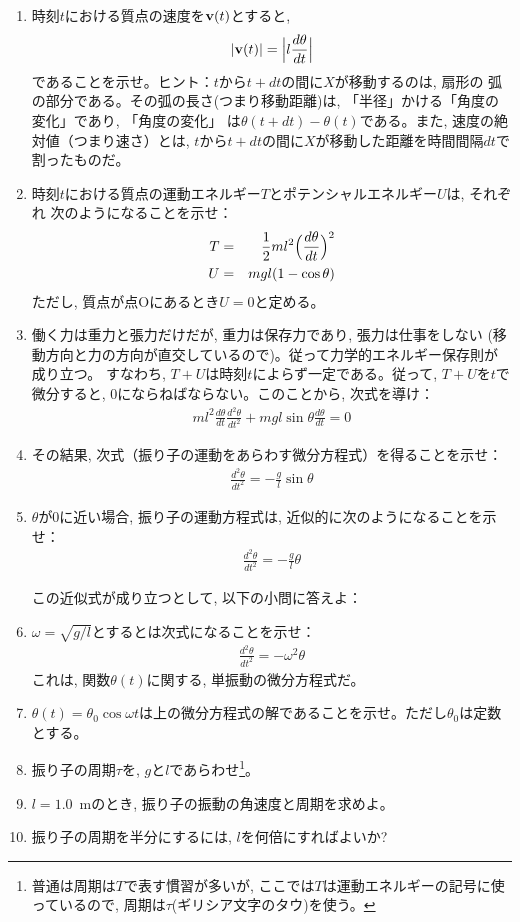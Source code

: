 \begin{q}
\begin{enumerate}
\item 時刻$t$における質点の速度を${\bf v}(t)$とすると, 
\begin{eqnarray} 
|{\bf v}(t)|=\Bigl|l\frac{d\theta}{dt}\Bigr|
\end{eqnarray} 
であることを示せ。ヒント：$t$から$t+dt$の間に$X$が移動するのは, 扇形の
弧の部分である。その弧の長さ(つまり移動距離)は, 
「半径」かける「角度の変化」であり, 「角度の変化」
は$\theta(t+dt)-\theta(t)$である。また, 速度の絶対値（つまり速さ）とは, 
$t$から$t+dt$の間に$X$が移動した距離を時間間隔$dt$で割ったものだ。
\item 時刻$t$における質点の運動エネルギー$T$とポテンシャルエネルギー$U$は, それぞれ
次のようになることを示せ：
\begin{eqnarray} 
T&=&\frac{1}{2}m l^2\Bigl(\frac{d\theta}{dt}\Bigr)^2\\
U&=&mgl(1-\cos \theta)
\end{eqnarray} 
ただし, 質点が点Oにあるとき$U=0$と定める。
\item 働く力は重力と張力だけだが, 重力は保存力であり, 張力は仕事をしない
(移動方向と力の方向が直交しているので)。従って力学的エネルギー保存則が成り立つ。
すなわち, $T+U$は時刻$t$によらず一定である。従って, 
$T+U$を$t$で微分すると, 0にならねばならない。このことから, 次式を導け：
\begin{eqnarray} 
ml^2\frac{d\theta}{dt}\frac{d^2\theta}{dt^2}+mgl\sin\theta\frac{d\theta}{dt}=0
\end{eqnarray} 
\item その結果, 次式（振り子の運動をあらわす微分方程式）を得ることを示せ：
\begin{eqnarray} 
\frac{d^2\theta}{dt^2}=-\frac{g}{l}\sin\theta\label{eq:furiko_equation}
\end{eqnarray} 
\item $\theta$が0に近い場合, 振り子の運動方程式は, 近似的に次のようになることを示せ：
\begin{eqnarray} 
\frac{d^2\theta}{dt^2}=-\frac{g}{l}\theta\label{eq:furiko_energy5}
\end{eqnarray} 

この近似式が成り立つとして, 以下の小問に答えよ：

\item $\omega=\sqrt{g/l}$とするとは次式になることを示せ：
\begin{eqnarray} 
\frac{d^2\theta}{dt^2}=-\omega^2\theta\label{eq:furiko_energy6}
\end{eqnarray} 
これは, 関数$\theta(t)$に関する, 単振動の微分方程式だ。
\item $\theta(t)=\theta_0 \cos\omega t$は上の微分方程式の解であることを示せ。ただし$\theta_0$は定数とする。
\item 振り子の周期$\tau$を, $g$と$l$であらわせ\footnote{普通は周期は$T$で表す慣習が多いが, ここでは$T$は運動エネルギーの記号に使っているので, 周期は$\tau$(ギリシア文字のタウ)を使う。}。
\item $l=1.0$~mのとき, 振り子の振動の角速度と周期を求めよ。
\item 振り子の周期を半分にするには, $l$を何倍にすればよいか?
\end{enumerate}
\end{q}
